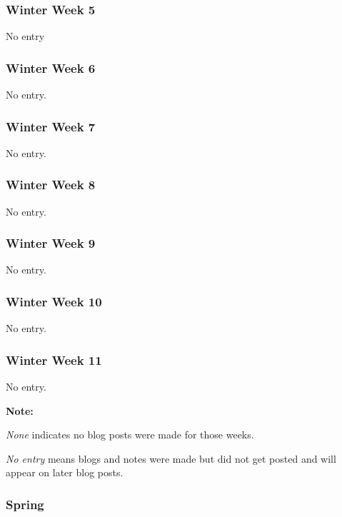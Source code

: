 \documentclass[compsoc,draftclsnofoot,onecolumn,10pt]{IEEEtran}
\begin{document}
\subsubsection*{Winter Week 5}
No entry


\subsubsection*{Winter Week 6}
No entry.


\subsubsection*{Winter Week 7}
No entry.


\subsubsection*{Winter Week 8}
No entry.


\subsubsection*{Winter Week 9}
No entry.


\subsubsection*{Winter Week 10}
No entry.


\subsubsection*{Winter Week 11}
No entry.



\textbf{Note:}\par
\textit{None} indicates no blog posts were made for those weeks.\par
\textit{No entry} means blogs and notes were made but did not get posted and will
appear on later blog posts.

\subsubsection{Spring}
\end{document}
